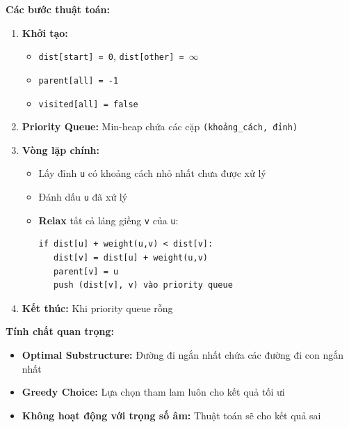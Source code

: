 \documentclass[12pt,a4paper]{article}
\begin{document}
\newpage

\textbf{Các bước thuật toán:}

\begin{enumerate}
   \item \textbf{Khởi tạo:}
   \begin{itemize}[label=\textbullet]
       \item \texttt{dist[start] = 0}, \texttt{dist[other] = $\infty$}
       \item \texttt{parent[all] = -1}
       \item \texttt{visited[all] = false}
   \end{itemize}

   \item \textbf{Priority Queue:} Min-heap chứa các cặp \texttt{(khoảng\_cách, đỉnh)}

   \item \textbf{Vòng lặp chính:}
   \begin{itemize}[label=\textbullet]
       \item Lấy đỉnh \texttt{u} có khoảng cách nhỏ nhất chưa được xử lý
       \item Đánh dấu \texttt{u} đã xử lý
       \item \textbf{Relax} tất cả láng giềng \texttt{v} của \texttt{u}:
       \begin{verbatim}
if dist[u] + weight(u,v) < dist[v]:
   dist[v] = dist[u] + weight(u,v)
   parent[v] = u
   push (dist[v], v) vào priority queue
       \end{verbatim}
   \end{itemize}

   \item \textbf{Kết thúc:} Khi priority queue rỗng
\end{enumerate}

\textbf{Tính chất quan trọng:}
\begin{itemize}[label=\textbullet]
   \item \textbf{Optimal Substructure:} Đường đi ngắn nhất chứa các đường đi con ngắn nhất
   \item \textbf{Greedy Choice:} Lựa chọn tham lam luôn cho kết quả tối ưi
   \item \textbf{Không hoạt động với trọng số âm:} Thuật toán sẽ cho kết quả sai
\end{itemize}
\end{document}
